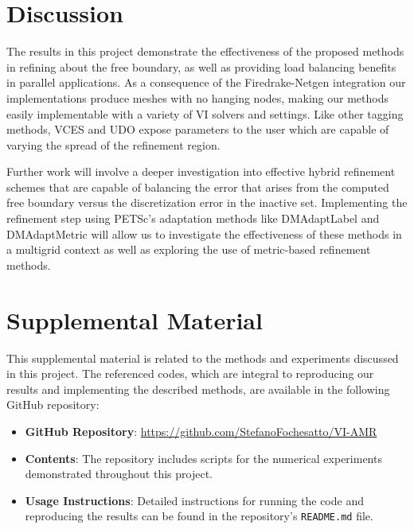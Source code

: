 \documentclass[12 pt]{report}
\begin{document}
\chapter{Discussion}
The results in this project demonstrate the effectiveness of the proposed methods in refining about the free boundary, as well as providing load balancing benefits in parallel applications. As a consequence of the Firedrake-Netgen integration our implementations produce meshes with no hanging nodes, making our methods easily implementable with a variety of VI solvers and settings. Like other tagging methods, VCES and UDO expose parameters to the user which are capable of varying the spread of the refinement region. 

Further work will involve a deeper investigation into effective hybrid refinement schemes that are capable of balancing the error that arises from the computed free boundary versus the discretization error in the inactive set. Implementing the refinement step using PETSc's adaptation methods like DMAdaptLabel and DMAdaptMetric will allow us to investigate the effectiveness of these methods in a multigrid context as well as exploring the use of metric-based refinement methods.





\clearpage



\appendix


\chapter{Supplemental Material}
This supplemental material is related to the methods and experiments discussed in this project. The referenced codes, which are integral to reproducing our results and implementing the described methods, are available in the following GitHub repository:

\begin{itemize} 
  \item \textbf{GitHub Repository}: \url{https://github.com/StefanoFochesatto/VI-AMR}
  \item \textbf{Contents}: The repository includes scripts for the numerical experiments demonstrated throughout this project. 
  \item \textbf{Usage Instructions}: Detailed instructions for running the code and reproducing the results can be found in the repository's \texttt{README.md} file. 
 \end{itemize}
\end{document}
